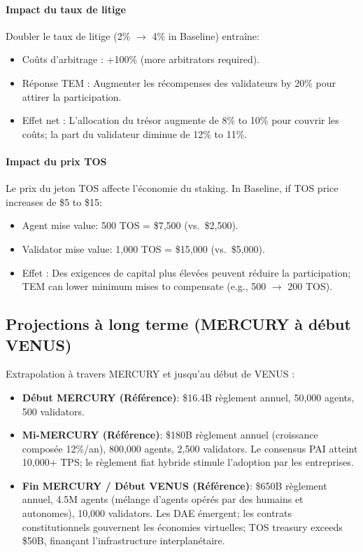 \documentclass[11pt]{article}
\begin{document}
\paragraph{Impact du taux de litige}
Doubler le taux de litige (2\% $\to$ 4\% in Baseline) entraîne:
\begin{itemize}[noitemsep]
  \item Coûts d'arbitrage : +100\% (more arbitrators required).
  \item Réponse TEM : Augmenter les récompenses des validateurs by 20\% pour attirer la participation.
  \item Effet net : L'allocation du trésor augmente de 8\% to 10\% pour couvrir les coûts; la part du validateur diminue de 12\% to 11\%.
\end{itemize}

\paragraph{Impact du prix TOS}
Le prix du jeton TOS affecte l'économie du staking. In Baseline, if TOS price increases de \$5 to \$15:
\begin{itemize}[noitemsep]
  \item Agent mise value: 500 TOS = \$7{,}500 (vs.\ \$2{,}500).
  \item Validator mise value: 1,000 TOS = \$15{,}000 (vs.\ \$5{,}000).
  \item Effet : Des exigences de capital plus élevées peuvent réduire la participation; TEM can lower minimum mises to compensate (e.g., 500 $\to$ 200 TOS).
\end{itemize}

\subsection{Projections à long terme (MERCURY à début VENUS)}
Extrapolation à travers MERCURY et jusqu'au début de VENUS :
\begin{itemize}[noitemsep]
  \item \textbf{Début MERCURY (Référence)}: \$16.4B règlement annuel, 50,000 agents, 500 validators.
  \item \textbf{Mi-MERCURY (Référence)}: \$180B règlement annuel (croissance composée 12\%/an), 800,000 agents, 2,500 validators. Le consensus PAI atteint 10,000+ TPS; le règlement fiat hybride stimule l'adoption par les entreprises.
  \item \textbf{Fin MERCURY / Début VENUS (Référence)}: \$650B règlement annuel, 4.5M agents (mélange d'agents opérés par des humains et autonomes), 10,000 validators. Les DAE émergent; les contrats constitutionnels gouvernent les économies virtuelles; TOS treasury exceeds \$50B, finançant l'infrastructure interplanétaire.
\end{itemize}
\end{document}
